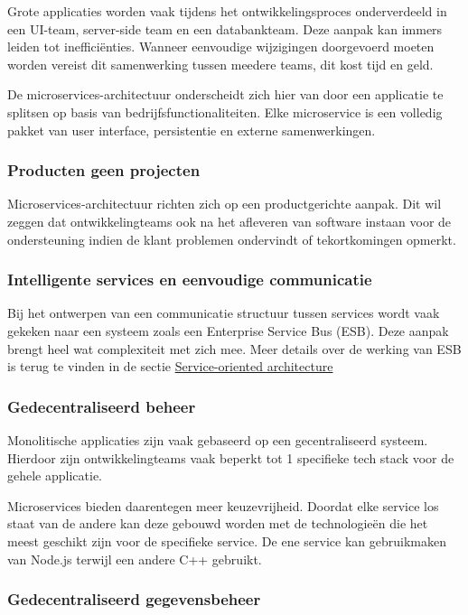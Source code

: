 Grote applicaties worden vaak tijdens het ontwikkelingsproces onderverdeeld in een UI-team, server-side team en een databankteam. Deze aanpak kan immers leiden tot inefficiënties. Wanneer eenvoudige wijzigingen doorgevoerd moeten worden vereist dit samenwerking tussen meedere teams, dit kost tijd en geld.

De microservices-architectuur onderscheidt zich hier van door een applicatie te splitsen op basis van bedrijfsfunctionaliteiten. Elke microservice is een volledig pakket van user interface, persistentie en externe samenwerkingen.

\subsubsection{Producten geen projecten}

Microservices-architectuur richten zich op een productgerichte aanpak. Dit wil zeggen dat ontwikkelingteams ook na het afleveren van software instaan voor de ondersteuning indien de klant problemen ondervindt of tekortkomingen opmerkt.

\subsubsection{Intelligente services en eenvoudige communicatie}

Bij het ontwerpen van een communicatie structuur tussen services wordt vaak gekeken naar een systeem zoals een Enterprise Service Bus (ESB). Deze aanpak brengt heel wat complexiteit met zich mee. Meer details over de werking van ESB is terug te vinden in de sectie \hyperref[sec:soa]{Service-oriented architecture}

\subsubsection{Gedecentraliseerd beheer}

Monolitische applicaties zijn vaak gebaseerd op een gecentraliseerd systeem. Hierdoor zijn ontwikkelingteams vaak beperkt tot 1 specifieke tech stack voor de gehele applicatie.

Microservices bieden daarentegen meer keuzevrijheid. Doordat elke service los staat van de andere kan deze gebouwd worden met de technologieën die het meest geschikt zijn voor de specifieke service. De ene service kan gebruikmaken van Node.js terwijl een andere C++ gebruikt.

\subsubsection{Gedecentraliseerd gegevensbeheer}

